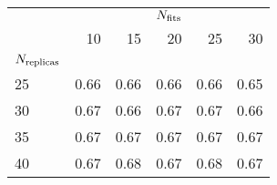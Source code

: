 \begin{center}
    \begin{tabular}{lrrrrr}
        \toprule
        {} & \multicolumn{5}{c}{$N_{\rm fits}$} \\
        {} &   10 &   15 &   20 &   25 &   30 \\
        $N_{\rm replicas}$ &      &      &      &      &      \\
        \midrule
        25            & 0.66 & 0.66 & 0.66 & 0.66 & 0.65 \\
        30            & 0.67 & 0.66 & 0.67 & 0.67 & 0.66 \\
        35            & 0.67 & 0.67 & 0.67 & 0.67 & 0.67 \\
        40            & 0.67 & 0.68 & 0.67 & 0.68 & 0.67 \\
        \bottomrule
        \end{tabular}
\end{center}